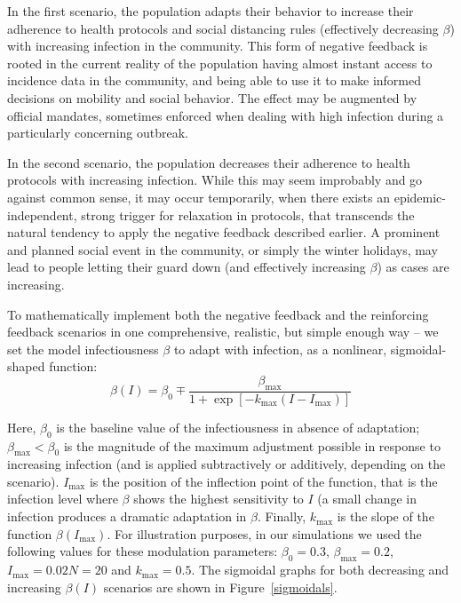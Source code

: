 \documentclass[10pt]{article}
\begin{document}
In the first scenario, the population adapts their behavior to increase their adherence to health protocols and social distancing rules (effectively decreasing $\beta$) with increasing infection in the community. This form of negative feedback is rooted in the current reality of the population having almost instant access to incidence data in the community, and being able to use it to make informed decisions on mobility and social behavior. The effect may be augmented by official mandates, sometimes enforced when dealing with high infection during a particularly concerning outbreak. 

In the second scenario, the population decreases their adherence to health protocols with increasing infection. While this may seem improbably and go against common sense, it may occur temporarily, when there exists an epidemic-independent, strong trigger for relaxation in protocols, that transcends the natural tendency to apply the negative feedback described earlier. A prominent and planned social event in the community, or simply the winter holidays, may lead to people letting their guard down (and effectively increasing $\beta$) as cases are increasing. 


To mathematically implement both the negative feedback and the reinforcing feedback scenarios in one comprehensive, realistic, but simple enough way -- we set the model infectiousness $\beta$ to adapt with infection, as a nonlinear, sigmoidal-shaped function:
\begin{equation}
\beta(I) = \beta_0 \mp \frac{\beta_{\max}}{1+\exp[-k_{\max}(I-I_{\max})]}
\end{equation}

\noindent Here, $\beta_0$ is the baseline value of the infectiousness in absence of adaptation; $\beta_{\max}<\beta_0$ is the magnitude of the maximum adjustment possible in response to increasing infection (and is applied subtractively or additively, depending on the scenario). $I_{\max}$ is the position of the inflection point of the function, that is the infection level where $\beta$ shows the highest sensitivity to $I$ (a small change in infection produces a dramatic adaptation in $\beta$. Finally, $k_{\max}$ is the slope of the function $\beta(I_{\max})$. For illustration purposes, in our simulations we used the following values for these modulation parameters: $\beta_0=0.3$, $\beta_{\max} = 0.2$, $I_{\max}=0.02N = 20$ and $k_{\max}=0.5$. The sigmoidal graphs for both decreasing and increasing $\beta(I)$ scenarios are shown in Figure~\ref{sigmoidals}.
\end{document}
